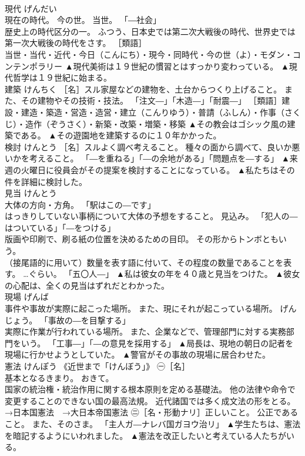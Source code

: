 \documentclass[8pt]{extreport}
\begin{document}
\begin{CJK}{UTF8}{min}
\\	現代	げんだい	
\\	現在の時代。 今の世。 当世。 「―社会」 
\\	歴史上の時代区分の一。 ふつう、日本史では第二次大戦後の時代、世界史では第一次大戦後の時代をさす。 ［類語］
\\	当世・当代・近代・今日（こんにち）・現今・同時代・今の世（よ）・モダン・コンテンポラリー	▲現代美術は１９世紀の慣習とはすっかり変わっている。 ▲現代哲学は１９世紀に始まる。
\\	建築	けんちく	［名］スル家屋などの建物を、土台からつくり上げること。 また、その建物やその技術・技法。 「注文―」「木造―」「耐震―」 ［類語］建設・建造・築造・営造・造営・建立（こんりゆう）・普請（ふしん）・作事（さくじ）・造作（ぞうさく）・新築・改築・増築・移築	▲その教会はゴシック風の建築である。 ▲その遊園地を建築するのに１０年かかった。
\\	検討	けんとう	［名］スルよく調べ考えること。 種々の面から調べて、良いか悪いかを考えること。 「―を重ねる」「―の余地がある」「問題点を―する」	▲来週の火曜日に役員会がその提案を検討することになっている。 ▲私たちはその件を詳細に検討した。
\\	見当	けんとう	
\\	大体の方向・方角。 「駅はこの―です」 
\\	はっきりしていない事柄について大体の予想をすること。 見込み。 「犯人の―はついている」「―をつける」 
\\	版画や印刷で、刷る紙の位置を決めるための目印。 その形からトンボともいう。 
\\	（接尾語的に用いて）数量を表す語に付いて、その程度の数量であることを表す。 …ぐらい。 「五〇人―」	▲私は彼女の年を４０歳と見当をつけた。 ▲彼女の心配は、全くの見当はずれだとわかった。
\\	現場	げんば	
\\	事件や事故が実際に起こった場所。 また、現にそれが起こっている場所。 げんじょう。 「事故の―を目撃する」 
\\	実際に作業が行われている場所。 また、企業などで、管理部門に対する実務部門をいう。 「工事―」「―の意見を採用する」	▲局長は、現地の朝日の記者を現場に行かせようとしていた。 ▲警官がその事故の現場に居合わせた。
\\	憲法	けんぽう	《近世まで「けんぼう」》 ㊀［名］ 
\\	基本となるきまり。 おきて。 
\\	国家の統治権・統治作用に関する根本原則を定める基礎法。 他の法律や命令で変更することのできない国の最高法規。 近代諸国では多く成文法の形をとる。 →日本国憲法　→大日本帝国憲法 ㊁［名・形動ナリ］正しいこと。 公正であること。 また、そのさま。 「主人ガ―ナレバ国ガヨウ治リ」	▲学生たちは、憲法を暗記するようにいわれました。 ▲憲法を改正したいと考えている人たちがいる。

\end{CJK}
\end{document}
